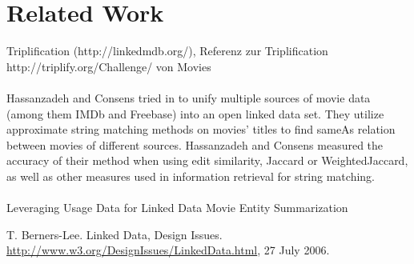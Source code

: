 \section{Related Work}
\label{sec_related_work}


Triplification (http://linkedmdb.org/), Referenz zur Triplification http://triplify.org/Challenge/ von Movies\\\\

Hassanzadeh and Consens tried in \cite{LMDB} to unify multiple sources of movie data (among them IMDb and Freebase) into an open linked data set.
They utilize approximate string matching methods on movies' titles to find sameAs relation between movies of different sources.
Hassanzadeh and Consens measured the accuracy of their method when using edit similarity, Jaccard or WeightedJaccard, as well as other measures used in information retrieval for string matching.\\\\

Leveraging Usage Data for Linked Data Movie Entity Summarization 
\cite{MovieSummarization}

T. Berners-Lee. Linked Data, Design Issues.
\url{http://www.w3.org/DesignIssues/LinkedData.html}, 27 July 2006.